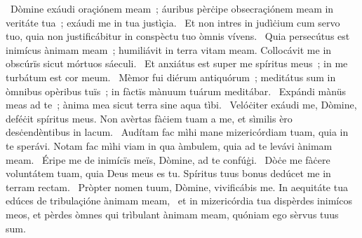 ~Dòmine exáudi oraçiónem meam~; áuribus pèrċipe obsecraçiónem meam in veritáte tua~; exáudi me in tua justìçia. 
~Et non intres in judìċium cum servo tuo, quia non justificábitur in conspèctu tuo òmnis vívens. 
~Quia persecútus est inimícus ànimam meam~; humiliávit in terra vitam meam. Collocávit me in obscúrïs sicut mórtuos sáeculi. 
~Et anxiátus est super me spíritus meus~; in me turbátum est cor meum. 
~Mèmor fui diérum antiquórum~; meditátus sum in òmnibus opèribus tuïs~; in fàctïs mànuum tuárum meditábar. 
~Expándi mànüs meas ad te~; ànima mea sicut terra sine aqua tìbi. 
~Velóċiter exáudi me, Dòmine, deféċit spíritus meus. Non avèrtas fàċiem tuam a me, et sìmilis èro desċendèntibus in lacum. 
~Audítam fac mìhi mane mizericórdiam tuam, quia in te sperávi. Notam fac mìhi viam in qua àmbulem, quia ad te levávi ànimam meam. 
~Éripe me de inimícïs meïs, Dòmine, ad te confúġi. 
~Dòċe me fàċere voluntátem tuam, quia Deus meus es tu. Spíritus tuus bonus dedúcet me in terram rectam. 
~Pròpter nomen tuum, Dòmine, vivificábis me. In aequitáte tua edúces de tribulaçióne ànimam meam, 
~et in mizericórdia tua dispèrdes inimícos meos, et pèrdes òmnes qui trìbulant ànimam meam, quóniam ego sèrvus tuus sum. 
